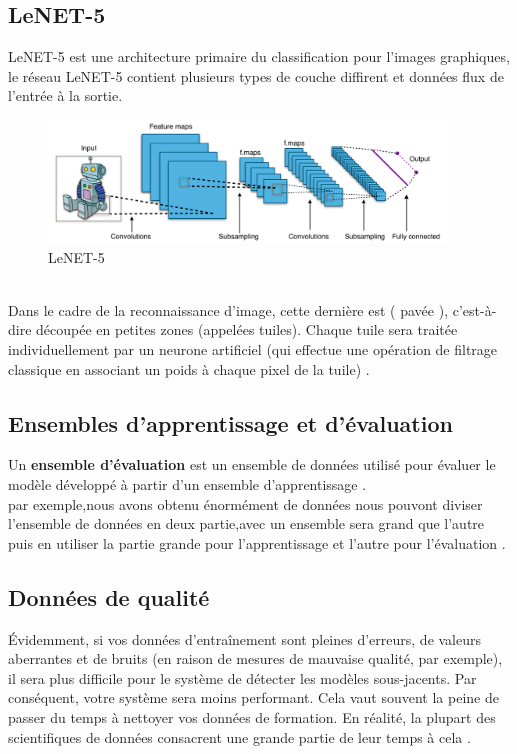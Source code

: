 \documentclass[12pt]{report}
\begin{document}
\subsection{LeNET-5}
LeNET-5 est une architecture primaire du classification pour l'images graphiques, le réseau LeNET-5 contient plusieurs types de couche diffirent et données flux de l'entrée à la sortie.
\begin{figure}[h]
\begin{center}
\includegraphics[width=400]{cnn.png}
\caption{LeNET-5}

\end{center}
\end{figure}
\\
Dans le cadre de la reconnaissance d'image, cette dernière est ( pavée ), c'est-à-dire découpée en petites zones (appelées tuiles). Chaque tuile sera traitée individuellement par un neurone artificiel (qui effectue une opération de filtrage classique en associant un poids à chaque pixel de la tuile) \cite{ref15}.



\newpage
\subsection{Ensembles d'apprentissage et d'évaluation}
Un\textbf{ ensemble d'évaluation }est un ensemble de données utilisé pour évaluer le modèle développé à partir d'un ensemble d'apprentissage \cite{ref15} .%
\\
par exemple,nous avons obtenu énormément de données nous pouvont diviser l'ensemble de données en deux partie,avec un ensemble  sera grand que l'autre puis en utiliser la partie grande pour l'apprentissage et l'autre pour l'évaluation \cite{ref15} .

\subsection{Données de qualité}
Évidemment, si vos données d'entraînement sont pleines d'erreurs, de valeurs aberrantes et de bruits (en raison de mesures de mauvaise qualité, par exemple), il sera plus difficile pour le système de détecter les modèles sous-jacents. Par conséquent, votre système sera moins performant. Cela vaut souvent la peine de passer du temps à nettoyer vos données de formation. En réalité, la plupart des scientifiques de données consacrent une grande partie de leur temps à cela  \cite{ref16}.
\end{document}
